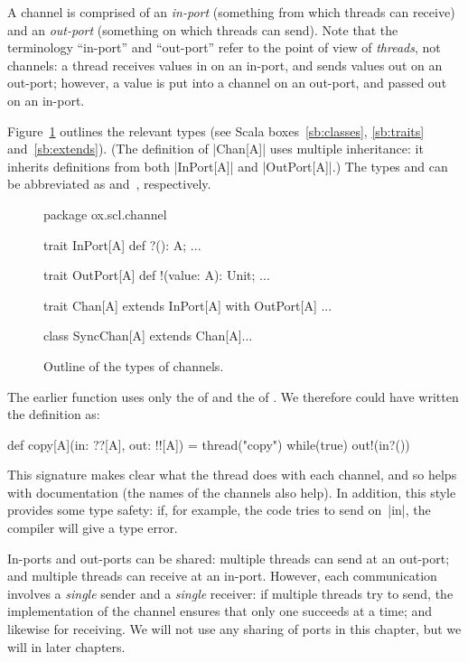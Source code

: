 
A channel is comprised of an \emph{in-port} (something from which threads can
receive) and an \emph{out-port} (something on which threads can send).  Note
that the terminology ``in-port'' and ``out-port'' refer to the point of view
of \emph{threads}, not channels: a thread receives values in on an in-port,
and sends values out on an out-port; however, a value is put into a channel on
an out-port, and passed out on an in-port.

Figure~\ref{fig:channel-types} outlines the relevant types (see Scala
boxes~\ref{sb:classes}, \ref{sb:traits} and~\ref{sb:extends}).  (The
definition of |Chan[A]| uses multiple inheritance: it inherits definitions
from both |InPort[A]| and |OutPort[A]|.)  The types  and
 can be abbreviated as  and~\SCALA{!![A]},
respectively.


\begin{figure}
\begin{scala}
package ox.scl.channel

trait InPort[A]{ def ?(): A; ... }
        
trait OutPort[A]{ def !(value: A): Unit; ... }
  
trait Chan[A] extends InPort[A] with OutPort[A]{ ... }

class SyncChan[A] extends Chan[A]{...} 
\end{scala}
\caption{Outline of the types of channels.}
\label{fig:channel-types}
\end{figure}


The earlier function  uses only the  of 
and the  of .  We therefore could have written the
definition as:
%
\begin{scala}
  def copy[A](in: ??[A], out: !![A]) = thread("copy"){ 
    while(true) out!(in?()) 
  }
\end{scala}
%
This signature makes clear what the thread does with each channel, and so
helps with documentation (the names of the channels also help).  In addition,
this style provides some  type safety: if, for example, the code tries to send
on~|in|, the compiler will give a type error. 

In-ports and out-ports can be shared: multiple threads can send at an
out-port; and multiple threads can receive at an in-port.  However,
each communication involves a \emph{single} sender and a \emph{single}
receiver: if multiple  threads try to send, the implementation of the channel
ensures that only one succeeds at a time; and likewise for receiving.  We will
not use any sharing of ports in this chapter, but we will in later chapters.

